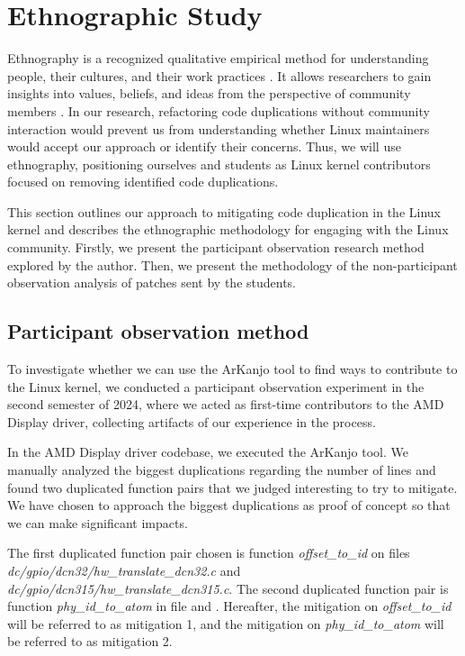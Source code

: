 \section{Ethnographic Study}

\label{sec:meteth}

Ethnography is a recognized qualitative empirical method for understanding people, 
their cultures, and their work practices \citep{bookethno}. It allows researchers 
to gain insights into values, beliefs, and ideas from the perspective of community 
members \citep{ethnosoft}. In our research, refactoring code duplications without 
community interaction would prevent us from understanding whether Linux maintainers 
would accept our approach or identify their concerns. Thus, we will use ethnography, 
positioning ourselves and students as Linux kernel contributors focused on removing 
identified  code duplications.

This section outlines our approach to mitigating code duplication in the Linux kernel 
and describes the ethnographic methodology for engaging with the Linux community. 
Firstly, we present the participant observation research method explored by the author. 
Then, we present the methodology of the non-participant observation analysis of patches 
sent by the students.

\subsection{Participant observation method}
\label{subsec:partmethod}

To investigate whether we can use the ArKanjo tool to find ways to contribute to the 
Linux kernel, we conducted a participant observation experiment in the second semester 
of 2024, where we acted as first-time contributors to the AMD Display driver, collecting 
artifacts of our experience in the process.

In the AMD Display driver codebase, we executed the ArKanjo tool. 
We manually analyzed the biggest duplications regarding the number of lines and found 
two duplicated function pairs that we judged interesting to try to mitigate. We 
have chosen to approach the biggest duplications as proof of concept so that we 
can make significant impacts. 

The first duplicated function pair chosen is function \textit{offset\_to\_id} on files \textit{dc/gpio/dcn32/hw\_translate\_dcn32.c} and \textit{dc/gpio/dcn315/hw\_translate\_dcn315.c}. The second duplicated function pair is function \textit{phy\_id\_to\_atom} in file 
\textit{ } and \textit{}.
Hereafter, the mitigation on \textit{offset\_to\_id} will be referred to as mitigation 1, and the mitigation on 
\textit{phy\_id\_to\_atom} will be referred to as mitigation 2.

